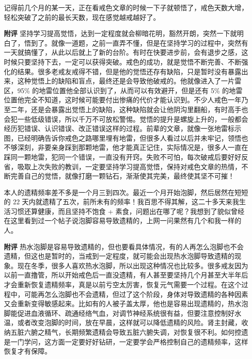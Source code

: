 \begin{case}
    记得前几个月的某一天，正在看戒色文章的时候一下子就顿悟了，戒色天数大增，轻松突破了之前的最长天数，现在感觉越戒越好了。

    \textbf{附评} 坚持学习提高觉悟，达到一定程度就会柳暗花明，豁然开朗，突然一下就明白了，悟到了。就像一道题，之前一直弄不懂，但是在坚持学习的过程中，突然有一天就搞懂了，从此以后就上了新的台阶。有时在快要进步前，会有退步之感，这时候只要坚持下去，一定可以获得突破。戒色的成功，就是觉悟不断完善、不断强化的结果。很多老戒友戒得不错，但是他的觉悟还存有缺陷，只是暂时没有暴露出来，这种觉悟上的缺陷和盲点，最终还是会导致他破戒的。他就像进入了一片雷区，95\% 的地雷位置他全部认识到了，从而可以有效避开，但是还有 5\% 的地雷位置他完全不知道，这时候可能要付出惨痛的代价才能认识到。不少人戒色一年乃至二年，还是会暴露出觉悟上的缺陷，这种缺陷就会让他阴沟里翻船，有时高手也会犯一些低级错误，所以千万不可放松警惕。觉悟的提升是螺旋上升的，一般都会经历犯错误、认识错误、改正错误这样的过程。前辈的文章，就像一张地雷标示图，已经明确告诉你戒色之路哪里埋有地雷，但很多人看过以后并未牢记，领悟也不够深刻，非要亲身踩到那颗地雷，他才能真正记住，实际情况是，很多人一直在踩同一颗地雷，犯同一个错误，一直没有开窍。失败不可怕，每次破戒后要好好反省，吸取上次失败的教训，一定要坚持学习提高觉悟，保持对戒色文章的热情，不断完善自己的觉悟，就像打磨一颗钻石，渐渐使其完美，最终使其坚不可摧！
\end{case}

\begin{case}
    本人的遗精频率差不多是一个月三到四次。最近一个月开始泡脚，然后居然在短短的 22 天内就遗精了五次，前所未有的频率！我百思不得其解，这二十多天来我生活习惯还算健康，而且坚持不饱食 + 素食，问题出在哪了呢？我想到了貌似曾经在这里看到过一个帖子说泡脚容易导致遗精的，上网一问果然有几个和我一样的人。

    \textbf{附评} 热水泡脚是容易导致遗精的，但也要看具体情况，有的人再怎么泡脚也不会遗精，但这也是暂时的，当戒到一定程度，就可能会出现热水泡脚导致遗精的现象。现在冬季，很多人喜欢热水泡脚，所以出现这种情况也比较多。很多戒友因为以前一直撸管，所以开始戒色后一直没遗精，有人甚至要坚持几个月甚至大半年后才会重新恢复遗精频率，真是以前亏空太厉害，恢复元气需要一个过程。在这个过程中，可能再怎么泡脚也不会遗精，但过了这个阶段，身体对导致遗精的各种因素又会重新变得敏感起来。比如有的人被子盖太厚，他也是容易出现遗精的，热水泡脚能促进血液循环、疏通经络气血，对调节神经系统很有益，但要注意控制好水温，或者改变泡脚的时间，放在早晨，这样就可以降低遗精的风险。肾主封藏，收纳五脏六腑之精气，长期频繁遗精会导致五脏六腑失调，对恢复很不利。如何控遗是一门学问，这方面一定要好好钻研，一定要学会严格控制自己的遗精频率，这样恢复才有保障。
\end{case}

